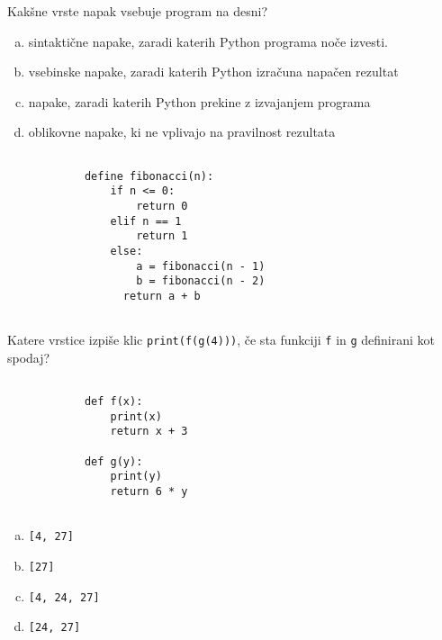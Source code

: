 \documentclass[arhiv, 10pt]{../izpit}
\newcommand{\inlinepy}[1]{\texttt{#1}}
\begin{document}
        \naloga*
        \begin{multicols}{2}
        \noindent
        Kakšne vrste napak vsebuje program na desni?

        \begin{enumerate}[(a)]
\item sintaktične napake, zaradi katerih Python programa noče izvesti.
\item vsebinske napake, zaradi katerih Python izračuna napačen rezultat
\item napake, zaradi katerih Python prekine z izvajanjem programa
\item oblikovne napake, ki ne vplivajo na pravilnost rezultata
\end{enumerate}

        \columnbreak

        \begin{verbatim}
        
            define fibonacci(n):
                if n <= 0:
                    return 0
                elif n == 1
                    return 1
                else:
                    a = fibonacci(n - 1)
                    b = fibonacci(n - 2)
                  return a + b
            
        \end{verbatim}

        \end{multicols}

    
        \naloga*
        Katere vrstice izpiše klic \inlinepy{print(f(g(4)))}, če sta funkciji \inlinepy{f} in \inlinepy{g} definirani kot spodaj?

        \begin{multicols}{2}
        \begin{verbatim}
        
            def f(x):
                print(x)
                return x + 3

            def g(y):
                print(y)
                return 6 * y
        
        \end{verbatim}

        \begin{enumerate}[(a)]
\item \inlinepy{[4, 27]}
\item \inlinepy{[27]}
\item \inlinepy{[4, 24, 27]}
\item \inlinepy{[24, 27]}
\end{enumerate}

        \end{multicols}
    
\end{document}
